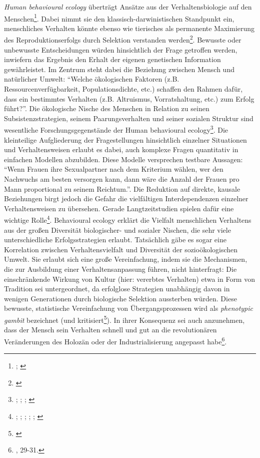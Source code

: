 \documentclass[openany,twoside,twocolumn]{book}
\let\rmarkdownfootnote\footnote%
\def\footnote{\protect\rmarkdownfootnote}
\begin{document}
\emph{Human behavioural ecology} überträgt Ansätze aus der
Verhaltensbiologie auf den Menschen\footnote{\textcite{smith_cultural_1992};
  \textcite{winterhalder_analyzing_2000}}. Dabei nimmt sie den
klassisch-darwinistischen Standpunkt ein, menschliches Verhalten könnte
ebenso wie tierisches als permanente Maximierung des
Reproduktionserfolgs durch Selektion verstanden werden\footnote{\textcite{creanza_cultural_2017}}.
Bewusste oder unbewusste Entscheidungen würden hinsichtlich der Frage
getroffen werden, inwiefern das Ergebnis den Erhalt der eigenen
genetischen Information gewährleistet. Im Zentrum steht dabei die
Beziehung zwischen Mensch und natürlicher Umwelt: ``Welche ökologischen
Faktoren (z.B. Ressourcenverfügbarkeit, Populationsdichte, etc.)
schaffen den Rahmen dafür, dass ein bestimmtes Verhalten (z.B.
Altruismus, Vorratshaltung, etc.) zum Erfolg führt?''. Die ökologische
Nische des Menschen in Relation zu seinen Subsistenzstrategien, seinem
Paarungsverhalten und seiner sozialen Struktur sind wesentliche
Forschungsgegenstände der Human behavioural ecology\footnote{\textcite{henrich_search_2001};
  \textcite{kaplan_theory_2000}; \textcite{voland_evolutionary_1998};
  \textcite{winterhalder_risk-senstive_1999}}. Die kleinteilige
Aufgliederung der Fragestellungen hinsichtlich einzelner Situationen und
Verhaltensweisen erlaubt es dabei, auch komplexe Fragen quantitativ in
einfachen Modellen abzubilden. Diese Modelle versprechen testbare
Aussagen: ``Wenn Frauen ihre Sexualpartner nach dem Kriterium wählen,
wer den Nachwuchs am besten versorgen kann, dann wäre die Anzahl der
Frauen pro Mann proportional zu seinem Reichtum.''. Die Reduktion auf
direkte, kausale Beziehungen birgt jedoch die Gefahr die vielfältigen
Interdependenzen einzelner Verhaltensweisen zu übersehen. Gerade
Langtzeitstudien spielen dafür eine wichtige Rolle\footnote{\textcite{belovsky_optimal_1988};
  \textcite{broughton_widening_1997}; \textcite{low_population_1993};
  \textcite{stiner_paleolithic_1999}; \textcite{stiner_tortoise_2000};
  \textcite{winterhalder_population_1988}}. Behavioural ecology erklärt
die Vielfalt menschlichen Verhaltens aus der großen Diversität
biologischer- und sozialer Nischen, die sehr viele unterschiedliche
Erfolgsstrategien erlaubt. Tatsächlich gäbe es sogar eine Korrelation
zwischen Verhaltensvielfalt und Diversität der sozioökologischen Umwelt.
Sie erlaubt sich eine große Vereinfachung, indem sie die Mechanismen,
die zur Ausbildung einer Verhaltensanpassung führen, nicht hinterfragt:
Die einschränkende Wirkung von Kultur (hier: vererbtes Verhalten) etwa
in Form von Tradition sei untergeordnet, da erfolglose Strategien
unabhängig davon in wenigen Generationen durch biologische Selektion
aussterben würden. Diese bewusste, statistische Vereinfachung von
Übergangsprozessen wird als \emph{phenotypic gambit} bezeichnet (und
kritisiert\footnote{\textcite{rubin_phenotypic_2016}}). In ihrer
Konsequenz sei auch anzunehmen, dass der Mensch sein Verhalten schnell
und gut an die revolutionären Veränderungen des Holozän oder der
Industrialisierung angepasst habe\footnote{\textcite{SmithThreestylesevolutionary2000},
  29-31.}.
\end{document}
